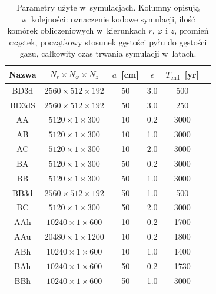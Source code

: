 \begin{table}
   \centering
   \begin{tabular}{cccccc}
      \hline
      Nazwa & $N_r \times N_\varphi \times N_z$ &
      $a$~[cm] & $\epsilon$ & $T_\textrm{end}$~[yr] \\
      \hline
      BD3d  &  $2560  \times 512 \times 192$  & 50  & 3.0 & 500  \\
      BD3dS &  $2560  \times 512 \times 192$  & 50  & 3.0 & 250  \\
      AA    &  $5120  \times 1   \times 300$  & 10  & 0.2 & 3000 \\
      AB    &  $5120  \times 1   \times 300$  & 10  & 1.0 & 3000 \\
      AC    &  $5120  \times 1   \times 300$  & 10  & 2.0 & 3000 \\
      BA    &  $5120  \times 1   \times 300$  & 50  & 0.2 & 3000 \\
      BB    &  $5120  \times 1   \times 300$  & 50  & 1.0 & 3000 \\
      BB3d  &  $2560  \times 512 \times 192$  & 50  & 1.0 & 500  \\
      BC    &  $5120  \times 1   \times 300$  & 50  & 2.0 & 3000 \\
      AAh   &  $10240 \times 1   \times 600$  & 10  & 0.2 & 1700 \\
      AAu   &  $20480 \times 1   \times 1200$ & 10  & 0.2 & 1800 \\
      ABh   &  $10240 \times 1   \times 600$  & 10  & 1.0 & 1400 \\
      BAh   &  $10240 \times 1   \times 600$  & 50  & 0.2 & 1730 \\
      BBh   &  $10240 \times 1   \times 600$  & 50  & 1.0 & 3000 \\
      \hline
   \end{tabular}
\caption{Parametry użyte w~symulacjach. Kolumny opisują w~kolejności: oznaczenie
   kodowe symulacji, ilość komórek obliczeniowych w~kierunkach $r$, $\varphi$ i
   $z$, promień cząstek, początkowy stosunek gęstości pyłu do gęstości gazu,
całkowity czas trwania symulacji w~latach.}
\label{tab1}
\end{table}

